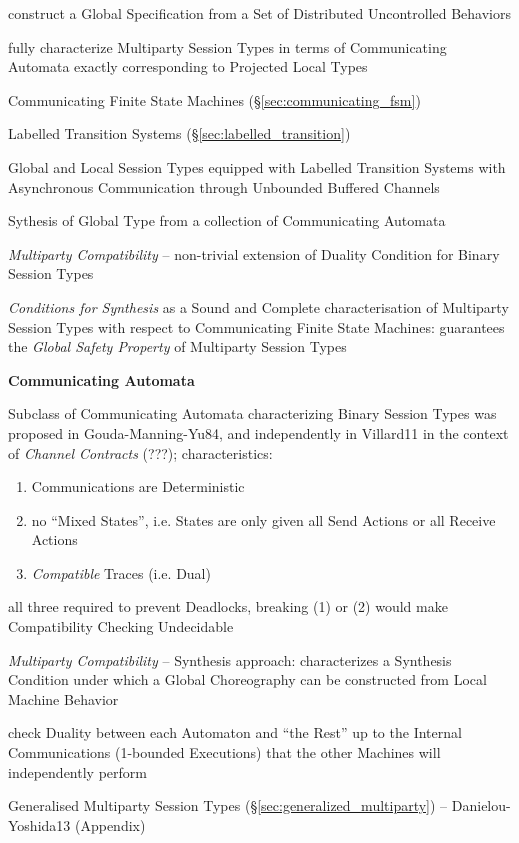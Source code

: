 construct a Global Specification from a Set of Distributed
Uncontrolled Behaviors

fully characterize Multiparty Session Types in terms of Communicating
Automata exactly corresponding to Projected Local Types

Communicating Finite State Machines (\S\ref{sec:communicating_fsm})

Labelled Transition Systems (\S\ref{sec:labelled_transition})

Global and Local Session Types equipped with Labelled Transition
Systems with Asynchronous Communication through Unbounded Buffered
Channels

Sythesis of Global Type from a collection of Communicating Automata

\emph{Multiparty Compatibility} -- non-trivial extension of Duality
Condition for Binary Session Types

\emph{Conditions for Synthesis} as a Sound and Complete
characterisation of Multiparty Session Types with respect to
Communicating Finite State Machines: guarantees the \emph{Global
  Safety Property} of Multiparty Session Types


\textbf{Communicating Automata}

Subclass of Communicating Automata characterizing Binary Session Types
was proposed in Gouda-Manning-Yu84, and independently in Villard11 in
the context of \emph{Channel Contracts} (???); characteristics:
\begin{enumerate}
  \item Communications are Deterministic
  \item no ``Mixed States'', i.e. States are only given all Send
    Actions or all Receive Actions
  \item \emph{Compatible} Traces (i.e. Dual)
\end{enumerate}

all three required to prevent Deadlocks, breaking (1) or (2) would
make Compatibility Checking Undecidable

\emph{Multiparty Compatibility} -- Synthesis approach: characterizes a
Synthesis Condition under which a Global Choreography can be
constructed from Local Machine Behavior

check Duality between each Automaton and ``the Rest'' up to the
Internal Communications (1-bounded Executions) that the other Machines
will independently perform

Generalised Multiparty Session Types
(\S\ref{sec:generalized_multiparty}) -- Danielou-Yoshida13 (Appendix)

